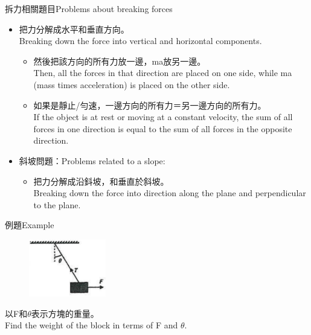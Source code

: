 \documentclass[beamer=true]{standalone}
\begin{document}
\begin{frame}{拆力相關題目Problems about breaking forces}
    \begin{itemize}
        \item 把力分解成水平和垂直方向。\\Breaking down the force into vertical and horizontal components.
              \begin{itemize}
                  \item 然後把該方向的所有力放一邊，ma放另一邊。\\Then, all the forces in that direction are placed on one side, while ma (mass times acceleration) is placed on the other side.
                  \item 如果是靜止/勻速，一邊方向的所有力＝另一邊方向的所有力。\\If the object is at rest or moving at a constant velocity, the sum of all forces in one direction is equal to the sum of all forces in the opposite direction.
              \end{itemize}
        \item 斜坡問題：Problems related to a slope:
              \begin{itemize}
                  \item 把力分解成沿鈄坡，和垂直於斜坡。\\Breaking down the force into direction along the plane and perpendicular to the plane.
              \end{itemize}
    \end{itemize}
\end{frame}

\begin{frame}[t]{例題Example}
    \begin{figure}[h!]
        \centering
        \includegraphics[width=0.3\textwidth]{assets/0b66fd6a.png}
    \end{figure}
    以F和$\theta$表示方塊的重量。\\Find the weight of the block in terms of F and $\theta$.
\end{frame}
\end{document}

